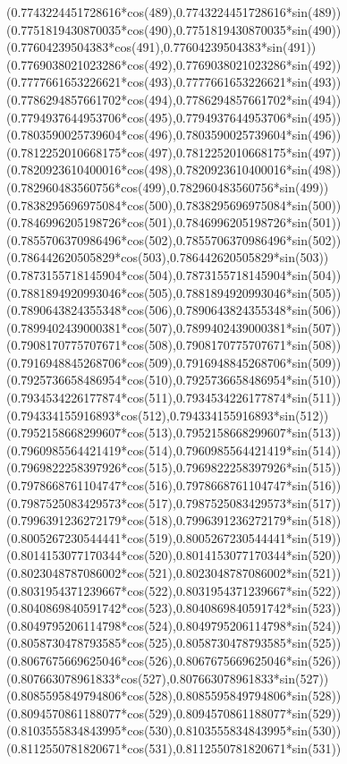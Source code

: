{({0.7743224451728616*cos(489)},{0.7743224451728616*sin(489)})
({0.7751819430870035*cos(490)},{0.7751819430870035*sin(490)})
({0.77604239504383*cos(491)},{0.77604239504383*sin(491)})
({0.7769038021023286*cos(492)},{0.7769038021023286*sin(492)})
({0.7777661653226621*cos(493)},{0.7777661653226621*sin(493)})
({0.7786294857661702*cos(494)},{0.7786294857661702*sin(494)})
({0.7794937644953706*cos(495)},{0.7794937644953706*sin(495)})
({0.7803590025739604*cos(496)},{0.7803590025739604*sin(496)})
({0.7812252010668175*cos(497)},{0.7812252010668175*sin(497)})
({0.7820923610400016*cos(498)},{0.7820923610400016*sin(498)})
({0.782960483560756*cos(499)},{0.782960483560756*sin(499)})
({0.7838295696975084*cos(500)},{0.7838295696975084*sin(500)})
({0.7846996205198726*cos(501)},{0.7846996205198726*sin(501)})
({0.7855706370986496*cos(502)},{0.7855706370986496*sin(502)})
({0.786442620505829*cos(503)},{0.786442620505829*sin(503)})
({0.7873155718145904*cos(504)},{0.7873155718145904*sin(504)})
({0.7881894920993046*cos(505)},{0.7881894920993046*sin(505)})
({0.7890643824355348*cos(506)},{0.7890643824355348*sin(506)})
({0.7899402439000381*cos(507)},{0.7899402439000381*sin(507)})
({0.7908170775707671*cos(508)},{0.7908170775707671*sin(508)})
({0.7916948845268706*cos(509)},{0.7916948845268706*sin(509)})
({0.7925736658486954*cos(510)},{0.7925736658486954*sin(510)})
({0.7934534226177874*cos(511)},{0.7934534226177874*sin(511)})
({0.794334155916893*cos(512)},{0.794334155916893*sin(512)})
({0.7952158668299607*cos(513)},{0.7952158668299607*sin(513)})
({0.7960985564421419*cos(514)},{0.7960985564421419*sin(514)})
({0.7969822258397926*cos(515)},{0.7969822258397926*sin(515)})
({0.7978668761104747*cos(516)},{0.7978668761104747*sin(516)})
({0.7987525083429573*cos(517)},{0.7987525083429573*sin(517)})
({0.7996391236272179*cos(518)},{0.7996391236272179*sin(518)})
({0.8005267230544441*cos(519)},{0.8005267230544441*sin(519)})
({0.8014153077170344*cos(520)},{0.8014153077170344*sin(520)})
({0.8023048787086002*cos(521)},{0.8023048787086002*sin(521)})
({0.8031954371239667*cos(522)},{0.8031954371239667*sin(522)})
({0.8040869840591742*cos(523)},{0.8040869840591742*sin(523)})
({0.8049795206114798*cos(524)},{0.8049795206114798*sin(524)})
({0.8058730478793585*cos(525)},{0.8058730478793585*sin(525)})
({0.8067675669625046*cos(526)},{0.8067675669625046*sin(526)})
({0.807663078961833*cos(527)},{0.807663078961833*sin(527)})
({0.8085595849794806*cos(528)},{0.8085595849794806*sin(528)})
({0.8094570861188077*cos(529)},{0.8094570861188077*sin(529)})
({0.8103555834843995*cos(530)},{0.8103555834843995*sin(530)})
({0.8112550781820671*cos(531)},{0.8112550781820671*sin(531)})
}
